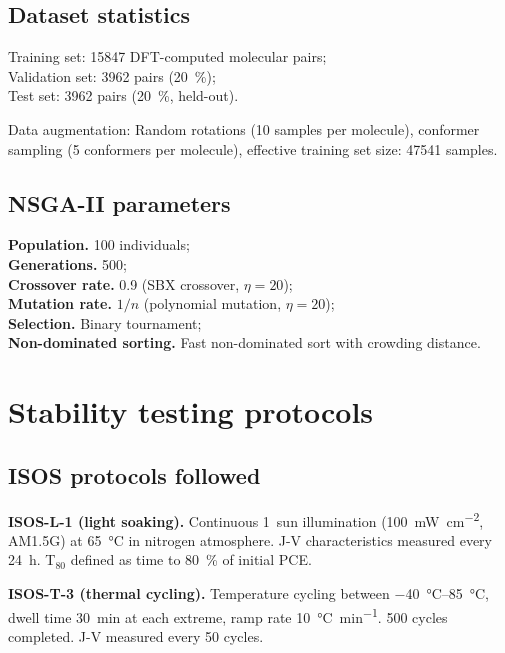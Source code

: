 \documentclass[11pt,a4paper]{article}
\begin{document}
\subsection{Dataset statistics}

Training set: \num{15847} DFT-computed molecular pairs;\\
Validation set: \num{3962} pairs (\SI{20}{\percent});\\
Test set: \num{3962} pairs (\SI{20}{\percent}, held-out).

Data augmentation: Random rotations (10 samples per molecule), conformer sampling (5 conformers per molecule), effective training set size: \num{47541} samples.

\subsection{NSGA-II parameters}

\textbf{Population.} \num{100} individuals;\\
\textbf{Generations.} \num{500};\\
\textbf{Crossover rate.} \num{0.9} (SBX crossover, $\eta = \num{20}$);\\
\textbf{Mutation rate.} $1/n$ (polynomial mutation, $\eta = \num{20}$);\\
\textbf{Selection.} Binary tournament;\\
\textbf{Non-dominated sorting.} Fast non-dominated sort with crowding distance.

\section{Stability testing protocols}\label{si:stability}

\subsection{ISOS protocols followed}

\textbf{ISOS-L-1 (light soaking).} Continuous \SI{1}{sun} illumination (\SI{100}{\milli\watt\per\centi\meter\squared}, AM1.5G) at \SI{65}{\degreeCelsius} in nitrogen atmosphere. J-V characteristics measured every \SI{24}{\hour}. T$_{80}$ defined as time to \SI{80}{\percent} of initial PCE.

\textbf{ISOS-T-3 (thermal cycling).} Temperature cycling between \SIrange{-40}{+85}{\degreeCelsius}, dwell time \SI{30}{\minute} at each extreme, ramp rate \SI{10}{\degreeCelsius\per\minute}. 500 cycles completed. J-V measured every 50 cycles.
\end{document}
